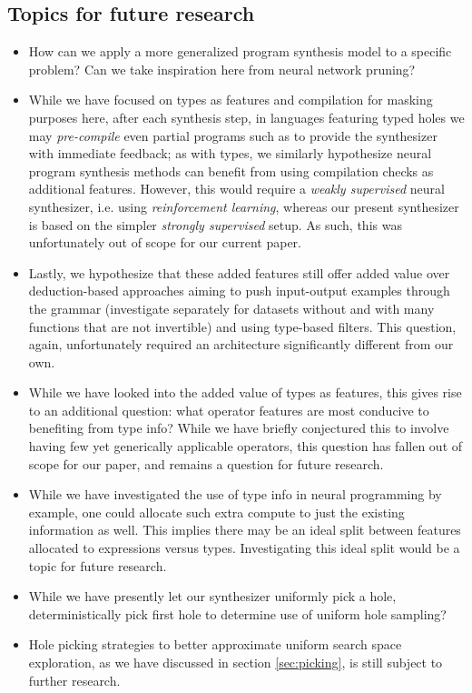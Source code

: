 \documentclass{article}
\begin{document}
\subsection{Topics for future research}
\begin{itemize}
    \item How can we apply a more generalized program synthesis model to a specific problem? Can we take inspiration here from neural network pruning?
    \item While we have focused on types as features and compilation for masking purposes here,
    after each synthesis step,
    in languages featuring typed holes we may \emph{pre-compile} even partial programs such as to provide the synthesizer with immediate feedback;
    as with types, we similarly hypothesize neural program synthesis methods can benefit from using compilation checks as additional features.
    However, this would require a \emph{weakly supervised} neural synthesizer,
    i.e. using \emph{reinforcement learning},
    whereas our present synthesizer is based on the simpler \emph{strongly supervised} setup.
    As such, this was unfortunately out of scope for our current paper.
    \item Lastly, we hypothesize that these added features still offer added value over
    deduction-based approaches aiming to push input-output examples through the grammar
    (investigate separately for datasets without and with many functions that are not invertible)
    and using type-based filters.
    This question, again, unfortunately required an architecture significantly different from our own.
    \item While we have looked into the added value of types as features,
    this gives rise to an additional question:
    what operator features are most conducive to benefiting from type info?
    While we have briefly conjectured this to involve having few yet generically applicable operators,
    this question has fallen out of scope for our paper,
    and remains a question for future research.
    \item While we have investigated the use of type info in neural programming by example,
    one could allocate such extra compute to just the existing information as well.
    This implies there may be an ideal split between features allocated to expressions versus types.
    Investigating this ideal split would be a topic for future research.
    \item While we have presently let our synthesizer uniformly pick a hole, deterministically pick first hole to determine use of uniform hole sampling?
    \item Hole picking strategies to better approximate uniform search space exploration,
    as we have discussed in section \ref{sec:picking}, is still subject to further research.
\end{itemize}


\nocite{*}
% 

\end{document}
